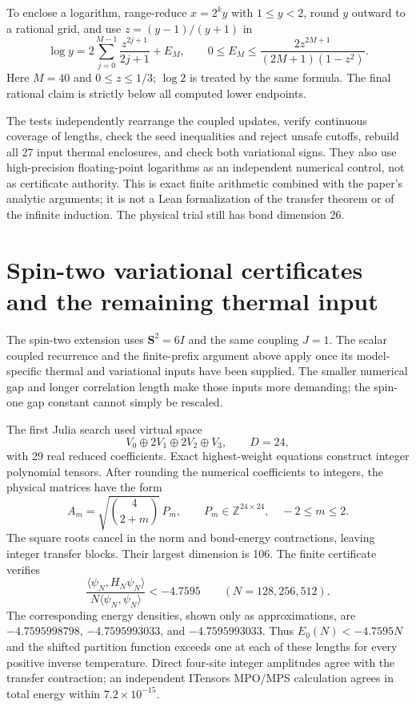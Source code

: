 \documentclass[11pt]{article}
\begin{document}
To enclose a logarithm, range-reduce $x=2^ky$ with $1\le y<2$, round $y$
outward to a rational grid, and use $z=(y-1)/(y+1)$ in
\[
 \log y=2\sum_{j=0}^{M-1}\frac{z^{2j+1}}{2j+1}+E_M,\qquad
 0\le E_M\le\frac{2z^{2M+1}}{(2M+1)(1-z^2)}.
\]
Here $M=40$ and $0\le z\le1/3$; $\log2$ is treated by the same formula.
The final rational claim is strictly below all computed lower endpoints.

The tests independently rearrange the coupled updates, verify continuous
coverage of lengths, check the seed inequalities and reject unsafe cutoffs,
rebuild all 27 input thermal enclosures, and check both variational signs.
They also use high-precision floating-point logarithms as an independent
numerical control, not as certificate authority.
This is exact finite arithmetic combined with the paper's analytic
arguments; it is not a Lean formalization of the transfer theorem or of
the infinite induction. The physical trial still has bond dimension 26.

\section{Spin-two variational certificates and the remaining thermal input}
The spin-two extension uses $\mathbf S^2=6I$ and the same coupling $J=1$.
The scalar coupled recurrence and the finite-prefix argument above apply
once its model-specific thermal and variational inputs have been supplied.
The smaller numerical gap and longer correlation length make those inputs
more demanding; the spin-one gap constant cannot simply be rescaled.

The first Julia search used virtual space
\[
 V_0\oplus2V_1\oplus2V_2\oplus V_3,\qquad D=24,
\]
with 29 real reduced coefficients. Exact highest-weight equations construct
integer polynomial tensors. After rounding the numerical coefficients to
integers, the physical matrices have the form
\[
 A_m=\sqrt{\binom4{2+m}}\,P_m,\qquad
 P_m\in\mathbb Z^{24\times24},\quad -2\le m\le2.
\]
The square roots cancel in the norm and bond-energy contractions, leaving
integer transfer blocks. Their largest dimension is 106. The finite
certificate verifies
\[
 \frac{\langle\psi_N,H_N\psi_N\rangle}
 {N\langle\psi_N,\psi_N\rangle}<-4.7595
 \qquad(N=128,256,512).
\]
The corresponding energy densities, shown only as approximations, are
$-4.7595998798$, $-4.7595993033$, and $-4.7595993033$.
Thus $E_0(N)<-4.7595N$ and the shifted partition function exceeds one
at each of these lengths for every positive inverse temperature.
Direct four-site integer amplitudes agree with the transfer contraction;
an independent ITensors MPO/MPS calculation agrees in total energy within
$7.2\times10^{-15}$.
\end{document}
